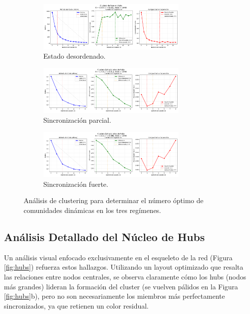 \documentclass[12pt, a4paper]{article}
\begin{document}
\begin{figure}[htbp]
    \centering
    \begin{subfigure}[b]{\textwidth}
        \centering
        \includegraphics[width=0.8\textwidth]{img/2_1.png}
        \caption{Estado desordenado.}
    \end{subfigure}
    \begin{subfigure}[b]{\textwidth}
        \centering
        \includegraphics[width=0.8\textwidth]{img/2_3.png}
        \caption{Sincronización parcial.}
    \end{subfigure}
    \begin{subfigure}[b]{\textwidth}
        \centering
        \includegraphics[width=0.8\textwidth]{img/2_5.png}
        \caption{Sincronización fuerte.}
    \end{subfigure}
    \caption{Análisis de clustering para determinar el número óptimo de comunidades dinámicas en los tres regímenes.}
    \label{fig:clustering}
\end{figure}


\subsection{Análisis Detallado del Núcleo de Hubs}
Un análisis visual enfocado exclusivamente en el esqueleto de la red (Figura \ref{fig:hubs}) refuerza estos hallazgos. Utilizando un layout optimizado que resalta las relaciones entre nodos centrales, se observa claramente cómo los hubs (nodos más grandes) lideran la formación del cluster (se vuelven pálidos en la Figura \ref{fig:hubs}b), pero no son necesariamente los miembros más perfectamente sincronizados, ya que retienen un color residual.
\end{document}
